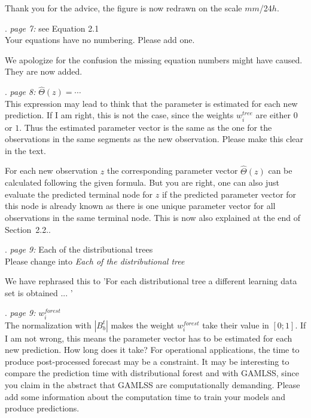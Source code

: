 \documentclass[american,foldmarks=false,noconfig]{uibklttr}
\newenvironment{review}{\fontshape{\itdefault}\fontseries{\bfdefault} \selectfont \smallskip}{\par}
\begin{document}
Thank you for the advice, the figure is now redrawn on the scale $mm$/24$h$.


\begin{review}
7. {\color{quotecolor}\textit{page 7:} see Equation 2.1}\\
Your equations have no numbering. Please add one.
\end{review}

We apologize for the confusion the missing equation numbers 
might have caused. They are now added.

\begin{review}
8. {\color{quotecolor}\textit{page 8:} $\hat{\Theta}(z) = \cdots$}\\
This expression may lead to think that the parameter is estimated 
for each new prediction. If I am right, this is not the case, 
since the weights $w_i^{tree}$ are either $0$ or $1$. Thus the 
estimated parameter vector is the same as the one for the 
observations in the same segments as the new observation.
Please make this clear in the text.
\end{review}

For each new observation $z$ the corresponding 
parameter vector $\hat{\Theta}(z)$ can be calculated following 
the given formula. But you are right, one can also just evaluate 
the predicted terminal node for $z$ if the predicted parameter
vector for this node is already known as there is one unique 
parameter vector for all observations in the same terminal node.
This is now also explained at the end of Section~2.2..


\begin{review}
9. {\color{quotecolor}\textit{page 9:} Each of the distributional trees}\\
Please change into \textit{Each of the distributional tree}
\end{review}

We have rephrased this to 'For each distributional tree a different learning 
data set is obtained ... '

\begin{review}
10. {\color{quotecolor}\textit{page 9:} $w_i^{forest}$}\\
The normalization with $|B_b^t|$ makes the weight $w_i^{forest}$ 
take their value in $[0; 1]$. If I am not wrong, this means the 
parameter vector has to be estimated for each new prediction. 
How long does it take? For operational applications, the time 
to produce post-processed forecast may be a constraint. It may 
be interesting to compare the prediction time with distributional 
forest and with GAMLSS, since you claim in the abstract that
GAMLSS are computationally demanding. Please add some information
about the computation time to train your models and produce predictions.
\end{review}
\end{document}
